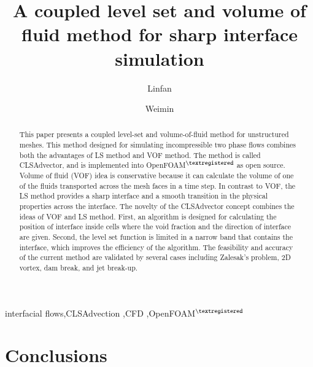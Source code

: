 \documentclass[times,final]{elsarticle}
\begin{document}

\begin{frontmatter}

\title{A coupled level set and volume of fluid method for sharp interface simulation}%

\author[1]{Linfan }
\author[1]{Weimin }

\address[1]{Affiliation 1, Address, City and Postal Code, China}
\address[2]{Affiliation 2, Address, City and Postal Code, Country}



\begin{abstract}
 This paper presents a coupled level-set and volume-of-fluid method for unstructured meshes. This method designed for simulating incompressible two phase flows combines both the advantages of LS method and VOF method. The method is called CLSAdvector, and is implemented into OpenFOAM$^{\textregistered}$ as open source. Volume of fluid (VOF) idea is conservative because it can calculate the volume of one of the fluids transported across the mesh faces in a time step. In contrast to VOF, the LS method provides a sharp interface and a smooth transition in the physical properties across the interface. The novelty of the CLSAdvector concept combines the ideas of VOF and LS method. First, an algorithm is designed for calculating the position of interface inside cells where the void fraction and the direction of interface are given. Second, the level set function is limited in a narrow band that contains the interface, which improves the efficiency of the algorithm. The feasibility and accuracy of the current method are validated by several cases including Zalesak's problem, 2D vortex, dam break, and jet break-up.
\end{abstract}
\begin{keyword}
interfacial flows\sep CLSAdvection \sep CFD \sep OpenFOAM$^{\textregistered}$
\end{keyword}

\end{frontmatter}






\section{Conclusions}





\end{document}

